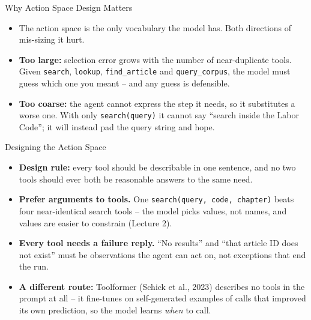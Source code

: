 \begin{frame}{Why Action Space Design Matters}
\begin{itemize}
  \item The action space is the only vocabulary the model has. Both directions of mis-sizing it hurt.
  \pause
  \item \textbf{Too large:} selection error grows with the number of near-duplicate tools. Given \texttt{search}, \texttt{lookup}, \texttt{find\_article} and \texttt{query\_corpus}, the model must guess which one you meant -- and any guess is defensible.
  \pause
  \item \textbf{Too coarse:} the agent cannot express the step it needs, so it substitutes a worse one. With only \texttt{search(query)} it cannot say ``search inside the Labor Code''; it will instead pad the query string and hope.
\end{itemize}
\end{frame}

\begin{frame}{Designing the Action Space}
\begin{itemize}
  \item \textbf{Design rule:} every tool should be describable in one sentence, and no two tools should ever both be reasonable answers to the same need.
  \pause
  \item \textbf{Prefer arguments to tools.} One \texttt{search(query, code, chapter)} beats four near-identical search tools -- the model picks values, not names, and values are easier to constrain (Lecture 2).
  \pause
  \item \textbf{Every tool needs a failure reply.} ``No results'' and ``that article ID does not exist'' must be observations the agent can act on, not exceptions that end the run.
  \pause
  \item \textbf{A different route:} Toolformer (Schick et al., 2023) describes no tools in the prompt at all -- it fine-tunes on self-generated examples of calls that improved its own prediction, so the model learns \emph{when} to call.
\end{itemize}
\end{frame}

